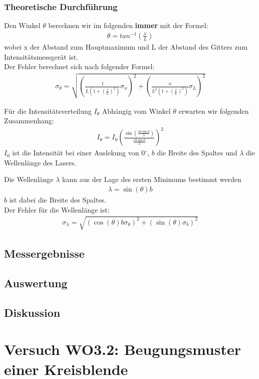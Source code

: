 \documentclass[12pt]{scrartcl}
\begin{document}
\subsubsection{Theoretische Durchführung}
Den Winkel $\theta$ berechnen wir im folgenden \textbf{immer} mit der Formel:
\begin{align}
\theta = tan^{-1}(\frac{x}{L})
\end{align}
wobei x der Abstand zum Hauptmaximum und L der Abstand des Gitters zum Intensitätsmessgerät ist.\\
Der Fehler berechnet sich nach folgender Formel:
\begin{align}
\sigma_\theta = \sqrt{
\left(\frac{1}{L\left(1+\left(\frac{x}{L}\right)^2\right)}\sigma_x\right)^2+
\left(\frac{x}{L^2\left(1+\left(\frac{x}{L}\right)^2\right)}\sigma_L\right)^2}
\end{align}

Für die Intensitätsverteilung $I_\theta$ Abhängig vom Winkel $\theta$ erwarten wir folgenden Zusammenhang:
\begin{align}
I_\theta = I_0 \left(\frac{\sin \left(\frac{\pi b \sin{\theta}}{\lambda}\right)}{\frac{\pi b \sin{\theta}}{\lambda}}\right)^2
\end{align}
$I_0$ ist die Intensität bei einer Auslekung von 0$^{\circ}$, $b$ die Breite des Spaltes und $\lambda$ die Wellenlänge des Lasers.

Die Wellenlänge $\lambda$ kann aus der Lage des ersten Minimums bestimmt werden
\begin{align}
\lambda = \sin(\theta) b
\end{align}
$b$ ist dabei die Breite des Spaltes.\\
Der Fehler für die Wellenlänge ist:
\begin{align}
\sigma_\lambda = \sqrt{
\left(\cos(\theta)b \sigma_\theta\right)^2+
\left(\sin(\theta) \sigma_b\right)^2}
\end{align}
\subsection{Messergebnisse}
\subsection{Auswertung}
\subsection{Diskussion}

\section{Versuch WO3.2: Beugungsmuster einer Kreisblende}
\end{document}
